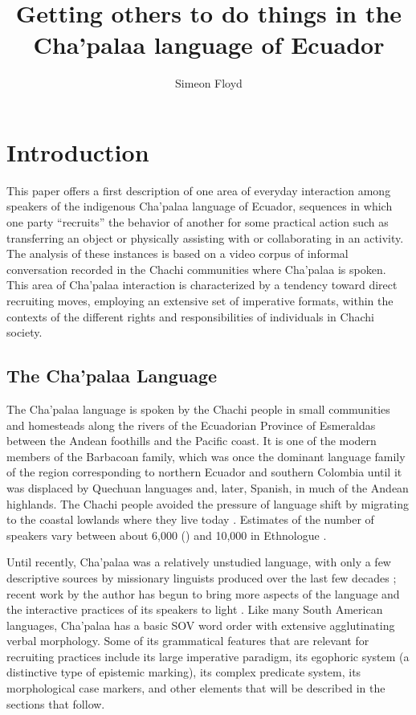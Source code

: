 \documentclass[output=paper]{langsci/langscibook}
\author{Simeon Floyd\affiliation{Department of Anthropology, Universidad San Francisco de Quito}}
\title{Getting others to do things in the Cha’palaa language of Ecuador}
\begin{document}
\maketitle
\label{sec:floyd}

\section{Introduction}\label{sec:floyd:1}

This paper offers a first description of one area of everyday interaction among speakers of the indigenous Cha'palaa language of Ecuador, sequences in which one party “recruits” the behavior of another for some practical action such as transferring an object or physically assisting with or collaborating in an activity. The analysis of these instances is based on a video corpus of informal conversation recorded in the Chachi communities where Cha'palaa is spoken. This area of Cha'palaa interaction is characterized by a tendency toward direct recruiting moves, employing an extensive set of imperative formats, within the contexts of the different rights and responsibilities of individuals in Chachi society.

\subsection{The Cha’palaa Language}\label{sec:floyd:1.1}

The Cha’palaa language is spoken by the Chachi people in small communities and homesteads along the rivers of the Ecuadorian Province of Esmeraldas between the Andean foothills and the Pacific coast. It is one of the modern members of the Barbacoan family, which was once the dominant language family of the region corresponding to northern Ecuador and southern Colombia until it was displaced by Quechuan languages and, later, Spanish, in much of the Andean highlands. The Chachi people avoided the pressure of language shift by migrating to the coastal lowlands where they live today \citep{JijónyCaamaño1914,DeBoer1996,Floyd2010}. Estimates of the number of speakers vary between about 6,000 (\citealt{INEC2010}) and 10,000 in Ethnologue \citep{LewisSimonsFennig2014}.

Until recently, Cha’palaa was a relatively unstudied language, with only a few descriptive sources by missionary linguists produced over the last few decades \citep{Moore1962,LindskoogLindskoog1964,Vittadello1988}; recent work by the author has begun to bring more aspects of the language and the interactive practices of its speakers to light \citep{Floyd2009,Floyd2010,Floyd2014a,Floyd2014b,Floyd2015,Floyd2016, Floyd2018,FloydBruil2011,dingemanse_conversation_2014,FloydNorcliffe2016,DingemanseRossiFloyd2017}. Like many South American languages, Cha’palaa has a basic SOV word order with extensive agglutinating verbal morphology. Some of its grammatical features that are relevant for recruiting practices include its large imperative paradigm, its egophoric system (a distinctive type of epistemic marking), its complex predicate system, its morphological case markers, and other elements that will be described in the sections that follow.
\end{document}
